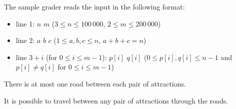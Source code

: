 The sample grader reads the input in the following format:
\begin{itemize}
\item line 1:  $n$ $m$ ($3 \leq n \leq 100\,000$, $2 \leq m \leq 200\,000$) 
\item line 2:  $a$ $b$ $c$ ($1 \leq a, b, c \leq n$, $a+b+c = n$)
\item line $3+i$ (for $0 \leq i \leq m-1$):  $p[i]$ $q[i]$ ($0 \leq p[i], q[i] \leq n-1$ and $p[i] \neq q[i]$ for $0 \leq i \leq m - 1$)
\end{itemize}

There is at most one road between each pair of attractions.

It is possible to travel between any pair of attractions through the roads.